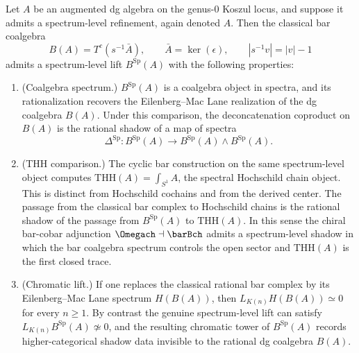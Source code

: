 \begin{conjecture}
\label{conj:spectrum-bar-lift}
Let $A$ be an augmented dg algebra on the genus-$0$ Koszul locus,
and suppose it admits a spectrum-level refinement, again denoted
$A$. Then the classical bar coalgebra
\[
 B(A) = T^c(s^{-1}\bar{A}),
 \qquad
 \bar{A} = \ker(\epsilon),
 \qquad
 |s^{-1}v| = |v| - 1
\]
admits a spectrum-level lift $B^{\mathrm{Sp}}(A)$ with the following
properties:
\begin{enumerate}[label=\textup{(\roman*)}]
\item \textup{(Coalgebra spectrum.)}
 $B^{\mathrm{Sp}}(A)$ is a coalgebra object in spectra, and its
 rationalization recovers the Eilenberg--Mac Lane realization of the
 dg coalgebra $B(A)$. Under this comparison, the deconcatenation
 coproduct on $B(A)$ is the rational shadow of a map of spectra
 \[
 \Delta^{\mathrm{Sp}}\colon
 B^{\mathrm{Sp}}(A)
 \longrightarrow
 B^{\mathrm{Sp}}(A) \wedge B^{\mathrm{Sp}}(A).
 \]
\item \textup{(THH comparison.)}
 The cyclic bar construction on the same spectrum-level object
 computes $\mathrm{THH}(A)=\int_{S^1}A$, the spectral Hochschild
 chain object. This is distinct from Hochschild cochains and from the
 derived center. The passage from the classical bar complex to
 Hochschild chains is the rational shadow of the passage from
 $B^{\mathrm{Sp}}(A)$ to $\mathrm{THH}(A)$. In this sense the
 chiral bar-cobar adjunction $\Omegach \dashv \barBch$ admits a
 spectrum-level shadow in which the bar coalgebra spectrum controls
 the open sector and $\mathrm{THH}(A)$ is the first closed trace.
\item \textup{(Chromatic lift.)}
 If one replaces the classical rational bar complex by its
 Eilenberg--Mac Lane spectrum $H(B(A))$, then
 $L_{K(n)}H(B(A)) \simeq 0$ for every $n \geq 1$. By contrast the
 genuine spectrum-level lift can satisfy
 $L_{K(n)}B^{\mathrm{Sp}}(A) \not\simeq 0$, and the resulting
 chromatic tower of $B^{\mathrm{Sp}}(A)$ records higher-categorical
 shadow data invisible to the rational dg coalgebra $B(A)$.
\end{enumerate}
\end{conjecture}


